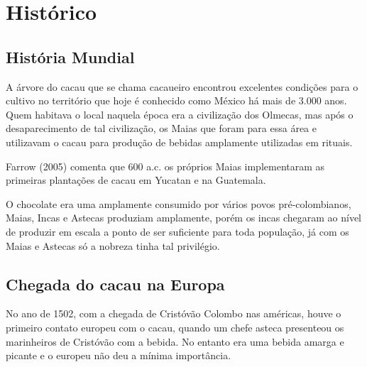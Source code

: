 \documentclass[
	12pt,				%
	openright,			%
	oneside,			%
	a4paper,			%
	english,			%
	french,				%
	spanish,			%
	brazil				%
	]{abntex2}
\begin{document}


\section{Histórico}

\subsection{História Mundial}

A árvore do cacau que se chama cacaueiro encontrou excelentes condições para o cultivo no território que hoje é conhecido como México há mais de 3.000 anos. Quem habitava o local naquela época era a civilização dos Olmecas, mas após o desaparecimento de tal civilização, os Maias que foram para essa área e utilizavam o cacau para produção de bebidas amplamente utilizadas em rituais. \cite{7}

Farrow (2005) comenta que 600 a.c. os próprios Maias implementaram as primeiras plantações de cacau em Yucatan e na Guatemala. \cite{7}

O chocolate era uma amplamente consumido por vários povos pré-colombianos, Maias, Incas e Astecas produziam amplamente, porém os incas chegaram ao nível de produzir em escala a ponto de ser suficiente para toda população, já com os Maias e Astecas só a nobreza tinha tal privilégio. 

\subsection{Chegada do cacau na Europa}

No ano de 1502, com a chegada de Cristóvão Colombo nas américas, houve o primeiro contato europeu com o cacau, quando um chefe asteca presenteou os marinheiros de Cristóvão com a bebida. No entanto era uma bebida amarga e picante e o europeu não deu a mínima importância. \cite{7}
\end{document}
